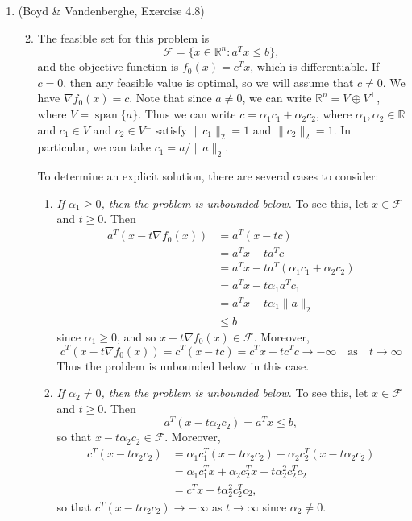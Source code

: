 \documentclass[letterpaper,12pt]{article}
\DeclareMathOperator{\spn}{span}
\begin{document}
\begin{enumerate}
\item (Boyd \& Vandenberghe, Exercise 4.8)
\begin{enumerate}
\setcounter{enumii}{1}
\item The feasible set for this problem is
  \begin{equation*}
    \mathcal{F} = \{x \in \mathbb{R}^n : a^T x \leq b\},
  \end{equation*}
  and the objective function is $f_0(x) = c^T x$, which is
  differentiable. If $c = 0$, then any feasible value is optimal, so
  we will assume that $c \neq 0$. We have $\nabla f_0(x) = c$. Note
  that since $a \neq 0$, we can write
  $\mathbb{R}^n = V \oplus V^\perp$, where $V = \spn\{a\}$. Thus we
  can write $c = \alpha_1 c_1 + \alpha_2 c_2$, where
  $\alpha_1, \alpha_2 \in \mathbb{R}$ and $c_1 \in V$ and
  $c_2 \in V^\perp$ satisfy $\lVert c_1 \rVert_2 = 1$ and
  $\lVert c_2 \rVert_2 = 1$. In particular, we can take
  $c_1 = a / \lVert a \rVert_2$.

  To determine an explicit solution, there are several cases to
  consider:
  \begin{enumerate}
  \item \textit{If $\alpha_1 \geq 0$, then the problem is unbounded
      below.} To see this, let $x \in \mathcal{F}$ and $t \geq
    0$. Then
    \begin{align*}
      a^T (x - t\nabla f_0(x)) &= a^T (x - tc) \\
        &= a^T x - ta^T c \\
        &= a^T x - ta^T (\alpha_1 c_1 + \alpha_2 c_2) \\
        &= a^T x - t\alpha_1 a^T c_1 \\
        &= a^T x - t\alpha_1 \lVert a \rVert_2 \\
        &\leq b
    \end{align*}
    since $\alpha_1 \geq 0$, and so
    $x - t\nabla f_0(x) \in \mathcal{F}$. Moreover,
    \begin{equation*}
      c^T (x - t\nabla f_0(x)) = c^T (x - tc) = c^T x - tc^T c \to -\infty
        \quad \text{as} \quad t \to \infty
    \end{equation*}
    Thus the problem is unbounded below in this case.

  \item \textit{If $\alpha_2 \neq 0$, then the problem is unbounded
      below.} To see this, let $x \in \mathcal{F}$ and $t \geq
    0$. Then
    \begin{equation*}
      a^T (x - t\alpha_2 c_2) = a^T x \leq b,
    \end{equation*}
    so that $x - t\alpha_2 c_2 \in \mathcal{F}$. Moreover,
    \begin{align*}
      c^T (x - t\alpha_2 c_2)
        &= \alpha_1 c_1^T (x - t\alpha_2 c_2)
          + \alpha_2 c_2^T (x - t\alpha_2 c_2) \\
        &= \alpha_1 c_1^T x + \alpha_2 c_2^T x - t\alpha_2^2 c_2^T c_2 \\
        &= c^T x - t\alpha_2^2 c_2^T c_2,
    \end{align*}
    so that $c^T (x - t\alpha_2 c_2) \to -\infty$ as $t \to \infty$
    since $\alpha_2 \neq 0$.


\end{enumerate}
\end{enumerate}
\end{enumerate}
\end{document}
